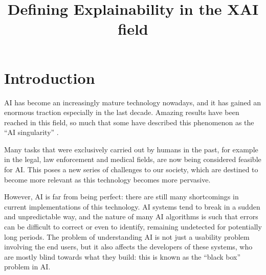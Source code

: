 \documentclass[conference]{IEEEtran}
\newcommand{\cit}[1][]{\todo[tickmarkheight=0.2cm]{cit #1}}
\begin{document}

\title{Defining Explainability in the XAI field}

\author{
    }

\maketitle

\begin{abstract}
\end{abstract}

\section{Introduction}
\label{sec:intro}

AI has become an increasingly mature technology nowadays, and it has gained an enormous traction especially in the last decade. Amazing results have been reached in this field, so much that some have described this phenomenon as the ``AI singularity'' \cit.

Many tasks that were exclusively carried out by humans in the past, for example
in the legal, law enforcement and medical fields, are now being considered
feasible for AI. \cit This poses a new series of challenges to our society,
which are destined to become more relevant as this technology becomes more
pervasive.


However, AI is far from being perfect: there
are still many shortcomings in current implementations of this technology.
AI systems tend to break in a sudden and unpredictable way, and the nature of many AI
algorithms is such that errors can be difficult to correct or even to identify, remaining undetected for potentially long periods. The problem of understanding AI is not just a usability problem involving the end users, but it also affects the developers of these systems, who are mostly blind
towards what they build: this is known as the ``black box'' problem in AI. \cit
\end{document}
